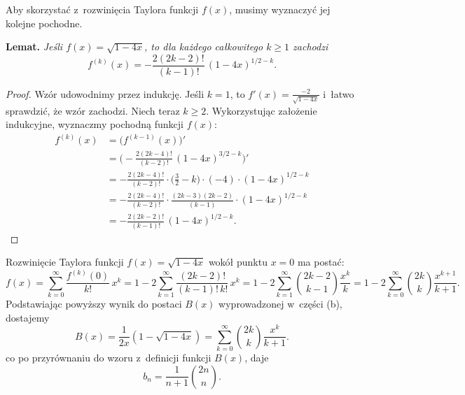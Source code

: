 \subproblem %


\subproblem %
\subproblem %
\subproblem %

\noindent Aby skorzystać z~rozwinięcia Taylora funkcji $f(x)$, musimy wyznaczyć jej kolejne pochodne.

\medskip
\noindent\textsf{\textbf{Lemat.}} \textit{Jeśli\/ $f(x)=\sqrt{1-4x}$, to dla\/ każdego całkowitego $k\ge1$ zachodzi
\[
	f^{(k)}(x) = -\frac{2(2k-2)!}{(k-1)!}\,(1-4x)^{1/2-k}.
\]
}
\begin{proof}
Wzór udowodnimy przez indukcję.
Jeśli $k=1$, to $f'(x)=\frac{-2}{\sqrt{1-4x}}$ i~łatwo sprawdzić, że wzór zachodzi.
Niech teraz $k\ge2$.
Wykorzystując założenie indukcyjne, wyznaczmy  pochodną funkcji $f(x)$:
\begin{align*}
	f^{(k)}(x) &= \bigl(f^{(k-1)}(x)\bigr)' \\
	&= \biggl(-\frac{2(2k-4)!}{(k-2)!}\,(1-4x)^{3/2-k}\biggr)' \\[1mm]
	&= -\frac{2(2k-4)!}{(k-2)!}\cdot\biggl(\frac{3}{2}-k\biggr)\cdot(-4)\cdot(1-4x)^{1/2-k} \\[1mm]
	&= -\frac{2(2k-4)!}{(k-2)!}\cdot\frac{(2k-3)(2k-2)}{(k-1)}\cdot(1-4x)^{1/2-k} \\[1mm]
	&= -\frac{2(2k-2)!}{(k-1)!}\,(1-4x)^{1/2-k}.
\end{align*}
\end{proof}

Rozwinięcie Taylora funkcji $f(x)=\sqrt{1-4x}$ wokół punktu $x=0$ ma postać:
\[
	f(x) = \sum_{k=0}^\infty\frac{f^{(k)}(0)}{k!}\,x^k = 1-2\sum_{k=1}^\infty\frac{(2k-2)!}{(k-1)!\,k!}\,x^k = 1-2\sum_{k=1}^\infty\binom{2k-2}{k-1}\frac{x^k}{k} = 1-2\sum_{k=0}^\infty\binom{2k}{k}\frac{x^{k+1}}{k+1}.
\]
Podstawiając powyższy wynik do postaci $B(x)$ wyprowadzonej w~części (b), dostajemy
\[
	B(x) = \frac{1}{2x}(1-\sqrt{1-4x}) = \sum_{k=0}^\infty\binom{2k}{k}\frac{x^k}{k+1}.
\]
co po przyrównaniu do wzoru z~definicji funkcji $B(x)$, daje
\[
	b_n = \frac{1}{n+1}\binom{2n}{n}.
\]

\subproblem %

\endinput
